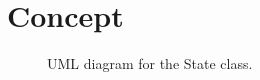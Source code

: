 \chapter{Concept}
\label{sec:concept}

\begin{figure}[ht]
    \centering
    \caption{UML diagram for the State class.}
    \label{fig:stateuml}
\end{figure}
